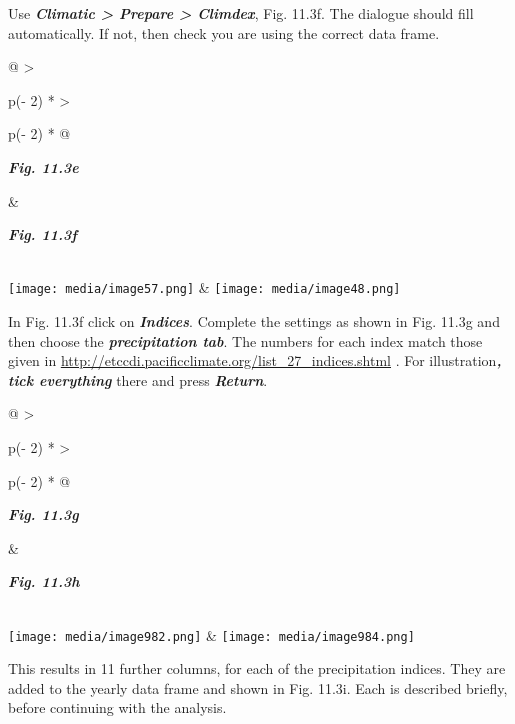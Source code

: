 \documentclass[
  letterpaper,
  DIV=11,
  numbers=noendperiod]{scrreprt}
\begin{document}
Use \textbf{\emph{Climatic \textgreater{} Prepare \textgreater{}
Climdex}}, Fig. 11.3f. The dialogue should fill automatically. If not,
then check you are using the correct data frame.

\begin{longtable}[]{@{}
  >{\raggedright\arraybackslash}p{(\columnwidth - 2\tabcolsep) * }
  >{\raggedright\arraybackslash}p{(\columnwidth - 2\tabcolsep) * }@{}}
\toprule\noalign{}
\begin{minipage}[b]{\linewidth}\raggedright
\textbf{\emph{Fig. 11.3e}}
\end{minipage} & \begin{minipage}[b]{\linewidth}\raggedright
\textbf{\emph{Fig. 11.3f}}
\end{minipage} \\
\midrule\noalign{}
\endhead
\bottomrule\noalign{}
\endlastfoot
\texttt{[image: media/image57.png]} &
\texttt{[image: media/image48.png]} \\
\end{longtable}

In Fig. 11.3f click on \textbf{\emph{Indices}}. Complete the settings as
shown in Fig. 11.3g and then choose the \textbf{\emph{precipitation
tab}}. The numbers for each index match those given in
\href{http://etccdi.pacificclimate.org/list_27_indices.shtml}{\ul{http://etccdi.pacificclimate.org/list\_27\_indices.shtml}}
. For illustration\textbf{\emph{, tick everything}} there and press
\textbf{\emph{Return}}.

\begin{longtable}[]{@{}
  >{\raggedright\arraybackslash}p{(\columnwidth - 2\tabcolsep) * }
  >{\raggedright\arraybackslash}p{(\columnwidth - 2\tabcolsep) * }@{}}
\toprule\noalign{}
\begin{minipage}[b]{\linewidth}\raggedright
\textbf{\emph{Fig. 11.3g}}
\end{minipage} & \begin{minipage}[b]{\linewidth}\raggedright
\textbf{\emph{Fig. 11.3h}}
\end{minipage} \\
\midrule\noalign{}
\endhead
\bottomrule\noalign{}
\endlastfoot
\texttt{[image: media/image982.png]} &
\texttt{[image: media/image984.png]} \\
\end{longtable}

This results in 11 further columns, for each of the precipitation
indices. They are added to the yearly data frame and shown in Fig.
11.3i. Each is described briefly, before continuing with the analysis.
\end{document}
